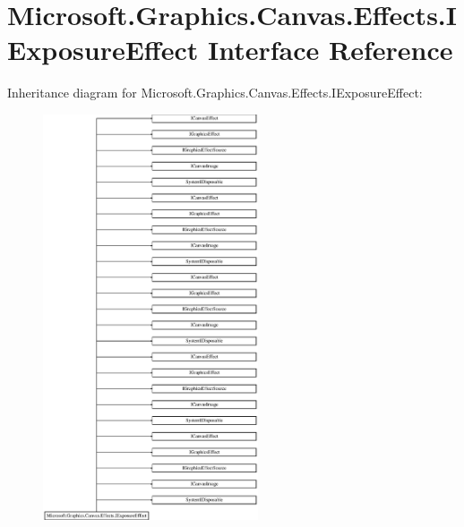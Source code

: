 \hypertarget{interface_microsoft_1_1_graphics_1_1_canvas_1_1_effects_1_1_i_exposure_effect}{}\section{Microsoft.\+Graphics.\+Canvas.\+Effects.\+I\+Exposure\+Effect Interface Reference}
\label{interface_microsoft_1_1_graphics_1_1_canvas_1_1_effects_1_1_i_exposure_effect}
Inheritance diagram for Microsoft.\+Graphics.\+Canvas.\+Effects.\+I\+Exposure\+Effect\+:\begin{figure}[H]
\begin{center}
\leavevmode
\includegraphics[height=12.000000cm]{interface_microsoft_1_1_graphics_1_1_canvas_1_1_effects_1_1_i_exposure_effect}
\end{center}
\end{figure}
